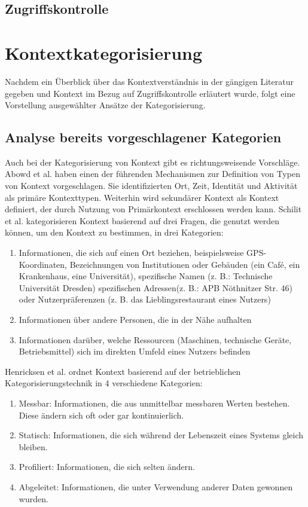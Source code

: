 \subsection{Zugriffskontrolle}
\section{Kontextkategorisierung}
Nachdem ein Überblick über das Kontextverständnis in der gängigen Literatur gegeben und Kontext im Bezug auf Zugriffskontrolle erläutert wurde, folgt eine Vorstellung ausgewählter Ansätze der Kategorisierung.
\subsection{ Analyse bereits vorgeschlagener Kategorien} 
Auch bei der Kategorisierung von Kontext gibt es richtungsweisende Vorschläge. Abowd et al.\cite{abowd_towards_1999} haben einen der führenden Mechanismen zur Definition von Typen von Kontext vorgeschlagen. Sie identifizierten Ort, Zeit, Identität und Aktivität als primäre Kontexttypen. Weiterhin wird sekundärer Kontext als Kontext definiert, der durch Nutzung von Primärkontext erschlossen werden kann. Schilit et al. \cite{schilit_context-aware_1994} kategorisieren Kontext basierend auf drei Fragen, die genutzt werden können, um den Kontext zu bestimmen, in drei Kategorien:
\begin{enumerate}
\item{Informationen, die sich auf einen Ort beziehen, beispielsweise GPS-Koordinaten, Bezeichnungen von Institutionen oder Gebäuden (ein Café, ein Krankenhaus, eine Universität), spezifische Namen (z. B.: Technische Universität Dresden) spezifischen Adressen(z. B.: APB Nöthnitzer Str. 46) oder Nutzerpräferenzen (z. B. das Lieblingsrestaurant eines Nutzers) }
\item{Informationen über andere Personen, die in der Nähe aufhalten}
\item{Informationen darüber, welche Ressourcen (Maschinen, technische Geräte, Betriebsmittel) sich im direkten Umfeld eines Nutzers befinden}
\end{enumerate}
Henricksen et al.\cite{henricksen2003framework} ordnet Kontext basierend auf der betrieblichen Kategorisierungstechnik in 4 verschiedene Kategorien:
\begin{enumerate}
\item {Messbar: Informationen, die aus unmittelbar messbaren Werten bestehen. Diese ändern sich oft oder gar kontinuierlich. }
\item {Statisch: Informationen, die sich während der Lebenszeit eines Systems gleich bleiben.}
\item {Profiliert: Informationen, die sich selten ändern.}
\item {Abgeleitet: Informationen, die unter Verwendung anderer Daten gewonnen wurden. }
\end{enumerate}
